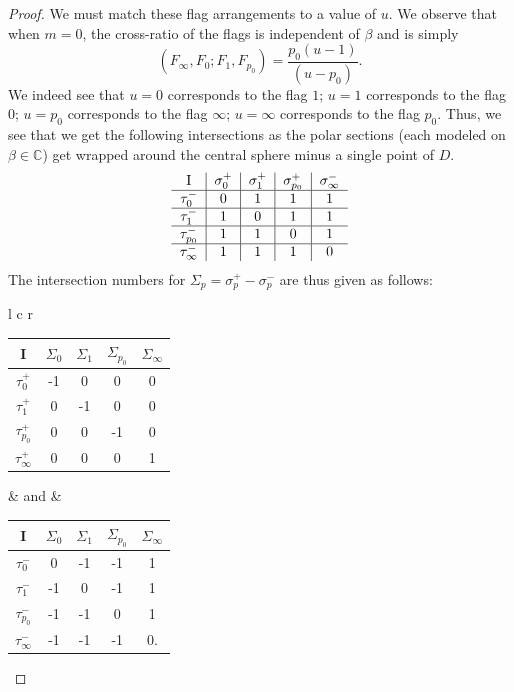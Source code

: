 \documentclass[10pt,a4paper]{amsart}
\newcommand{\C}{\ensuremath{\mathbb C}}
\def\mathbf#1{#1}%
\begin{document}
\begin{proof}
We must match these flag arrangements to a value of $u$. 
We observe that when $\mathbf{m}=\mathbf{0}$, the cross-ratio of the flags is independent of $\beta$ and is simply 
\[(F_\infty, F_0; F_1, F_{p_0} ) = \frac{p_0(u-1)}{(u-p_0)}. \]
We indeed see that $u=0$ corresponds to the flag $1$; $u=1$ corresponds to the flag $0$; $u=p_0$ corresponds to the flag $\infty$; $u=\infty$ corresponds to the flag $p_0$. 
Thus, we see that we get the following intersections as the polar sections (each modeled on $\beta \in \C$) get wrapped around the central sphere minus a single point of $D$.
\begin{equation}
\begin{tabular}{  c | c | c |c|c }
    I & $\sigma^+_0$ & $\sigma^+_1$ & $\sigma^+_{p_0}$ & $\sigma^-_\infty$ \\ \hline
    $\tau_0^-$ & 0 & 1 & 1 & 1\\ \hline
    $\tau_1^-$ & 1 & 0 & 1 & 1\\ \hline
    $\tau_{p_0}^-$ & 1 & 1  & 0 & 1\\ \hline
    $\tau_\infty^-$ & 1 & 1  & 1 & 0\\
\end{tabular}
\end{equation}
The intersection numbers for $\Sigma_p = \sigma_p^+- \sigma_p^-$ are thus given as follows:

\begin{center}

\begin{tabular}{l c r}
	
\begin{tabular}{  c | c | c |c|c }
    I & $\Sigma_0$ & $\Sigma_1$ & $\Sigma_{p_0}$ & $\Sigma_\infty$ \\ \hline
    $\tau_0^+$ & -1 & 0 & 0 & 0\\ \hline
    $\tau_1^+$ & 0 & -1 & 0 & 0\\ \hline
    $\tau_{p_0}^+$ & 0 & 0  & -1 & 0\\ \hline
    $\tau_\infty^+$ & 0 & 0  & 0 & 1\\
\end{tabular}

&  and &

\begin{tabular}{  c | c | c |c|c }
    I & $\Sigma_0$ & $\Sigma_1$ & $\Sigma_{p_0}$ & $\Sigma_\infty$ \\ \hline
    $\tau_0^-$ & 0 & -1 & -1 & 1\\ \hline
    $\tau_1^-$ & -1 & 0 & -1 & 1\\ \hline
    $\tau_{p_0}^-$ & -1 & -1  & 0 & 1\\ \hline
    $\tau_\infty^-$ & -1 & -1  & -1 & 0.\\
\end{tabular}


\end{tabular}
\end{center}
\end{proof}
\end{document}
